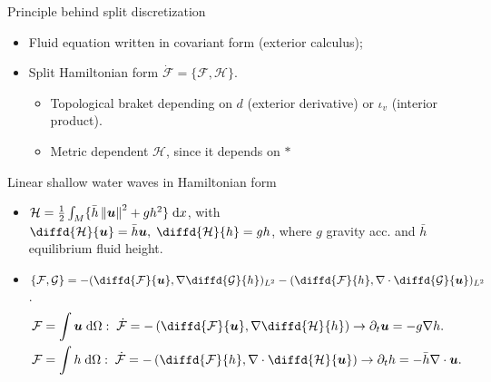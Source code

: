 \documentclass{beamer}
\newcommand*{\norm}[1]{\ensuremath{\left\|#1\right\|}}
\begin{document}
\begin{frame}[fragile]{Principle behind split discretization}
\begin{itemize}
	\item Fluid equation written in covariant form (exterior calculus);
	\item Split Hamiltonian form $\dot{\mathcal{F}}= \{\mathcal{F}, \mathcal{H}\}$.	
	\begin{itemize}
		\item Topological braket depending on $d$ (exterior derivative) or $\iota_v$ (interior product).
		\item Metric dependent $\mathcal{H}$, since it depends on $*$
	\end{itemize}
\end{itemize}	
\begin{block}{Linear shallow water waves in Hamiltonian form}
	\begin{itemize}
		\item $\mathcal{H} = \frac{1}{2} \int_M\{\bar{h} \norm{\bm{u}}^2 + g h^2\}\d{x}$, with $\diffd{\mathcal{H}}{\bm{u}} = \bar{h}\bm{u}, \; \diffd{\mathcal{H}}{h}=g h$, where $g$ gravity acc. and $\bar{h}$ equilibrium fluid height.
		\item $\{\mathcal{F}, \mathcal{G}\} = -(\diffd{\mathcal{F}}{\bm{u}}, \nabla \diffd{\mathcal{G}}{h})_{L^2} - (\diffd{\mathcal{F}}{h}, \nabla \cdot \diffd{\mathcal{G}}{\bm{u}})_{L^2}$.
		\begin{equation*}
			\begin{aligned}
				\mathcal{F} &= \int \bm{u} \d{\Omega}: \; \dot{\mathcal{F}} = - \left(\diffd{\mathcal{F}}{\bm{u}}, \nabla \diffd{\mathcal{H}}{h}\right) \rightarrow \partial_t \bm{u} = -g \nabla h. \\
				\mathcal{F} &= \int h \d{\Omega}: \;\dot{\mathcal{F}} = - \left(\diffd{\mathcal{F}}{h}, \nabla \cdot \diffd{\mathcal{H}}{\bm{u}}\right) \rightarrow \partial_t h = -\bar{h} \nabla \cdot \bm{u}.
			\end{aligned}
		\end{equation*}
		
	\end{itemize}
\end{block}

\end{frame}
\end{document}
